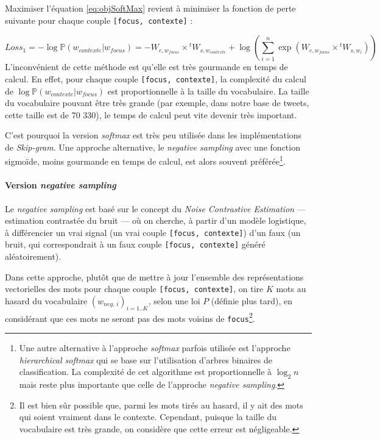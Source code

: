 \documentclass[11pt,french,french]{article}
\let\rmarkdownfootnote\footnote%
\def\footnote{\protect\rmarkdownfootnote}
\begin{document}
Maximiser l'équation \eqref{eq:objSoftMax} revient à minimiser la fonction
de perte suivante pour chaque couple \texttt{{[}focus,\ contexte{]}} :

\[
Loss_{1}=-\log\mathbb P(w_{contexte}\vert w_{focus}) =
-W_{e,w_{focus}}\times {}^tW_{s,w_{contexte}}+
\log\left(\sum_{i=1}^n\exp(W_{e,w_{focus}}\times {}^t W_{s,w_i})\right)
\] L'inconvénient de cette méthode est qu'elle est très gourmande en
temps de calcul. En effet, pour chaque couple
\texttt{{[}focus,\ contexte{]}}, la complexité du calcul de
\(\log\mathbb P(w_{contexte}\vert w_{focus})\) est proportionnelle à la
taille du vocabulaire. La taille du vocabulaire pouvant être très grande
(par exemple, dans notre base de tweets, cette taille est de 70 330), le
temps de calcul peut vite devenir très important.

C'est pourquoi la version \emph{softmax} est très peu utilisée dans les
implémentations de \emph{Skip-gram}. Une approche alternative, le
\emph{negative sampling} avec une fonction sigmoïde, moins gourmande en
temps de calcul, est alors souvent préférée\footnote{Une autre
  alternative à l'approche \emph{softmax} parfois utilisée est
  l'approche \emph{hierarchical softmax} qui se base sur l'utilisation
  d'arbres binaires de classification. La complexité de cet algorithme
  est proportionnelle à \(\log_2n\) mais reste plus importante que celle
  de l'approche \emph{negative sampling}.}.

\paragraph{\texorpdfstring{Version \emph{negative
sampling}}{Version negative sampling}}\label{subsec:negsampling}

Le \emph{negative sampling} est basé sur le concept du \emph{Noise
Contrastive Estimation} --- estimation contrastée du bruit --- où on
cherche, à partir d'un modèle logistique, à différencier un vrai signal
(un vrai couple \texttt{{[}focus,\ contexte{]}}) d'un faux (un bruit,
qui correspondrait à un faux couple \texttt{{[}focus,\ contexte{]}}
généré aléatoirement).

Dans cette approche, plutôt que de mettre à jour l'ensemble des
représentations vectorielles des mots pour chaque couple
\texttt{{[}focus,\ contexte{]}}, on tire \(K\) mots au hasard du
vocabulaire \((w_{neg,\,i})_{i=1..K}\), selon une loi \(P\) (définie
plus tard), en considérant que ces mots ne seront pas des mots voisins
de \texttt{focus}\footnote{Il est bien sûr possible que, parmi les mots
  tirés au hasard, il y ait des mots qui soient vraiment dans le
  contexte. Cependant, puisque la taille du vocabulaire est très grande,
  on considère que cette erreur est négligeable.}.
\end{document}
